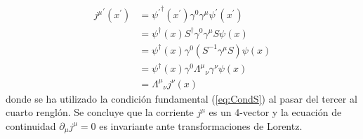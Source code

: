 \begin{equation}
\begin{aligned}
{j^{\mu}}^{\prime}(x^\prime)&={\psi^{\prime}}^{\dagger}(x^\prime)\gamma^0 \gamma^{\mu}\psi^\prime (x^\prime)\\
&=\psi^{\dagger}(x)S^{\dagger} \gamma^0 \gamma^{\mu} S \psi(x)\\
&=\psi^{\dagger}(x)\gamma^0 \left( S^{-1} \gamma^{\mu} S \right) \psi(x)\\
&=\psi^{\dagger}(x)\gamma^0 \Lambda^{\mu}{}_{\nu}\gamma^{\nu} \psi(x)\\
&=\Lambda^{\mu}{}_{\nu} j^{\nu} (x)
\end{aligned}
\end{equation}
donde se ha utilizado la condición fundamental (\ref{eq:CondS}) al pasar del tercer al cuarto renglón. Se concluye que la corriente $j^\mu$ es un 4-vector y la ecuación de continuidad $\partial_\mu j^\mu =0$ es invariante ante transformaciones de Lorentz.

%
%

